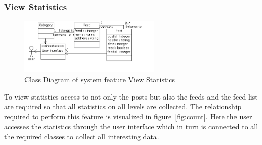 \subsubsection{View Statistics}
\begin{figure}[hbt]
\centering
\includegraphics[width=0.6\textwidth]
{./images/CountUnreadPosts.png}
\caption{Class Diagram of system feature View Statistics}
\label{fig:statistics}
\end{figure}
To view statistics access to not only the posts but also the feeds and the feed list are required so that all statistics on all levels are collected. The relationship required to perform this feature is visualized in figure~\ref{fig:count}. Here the user accesses the statistics through the user interface which in turn is connected to all the required classes to collect all interesting data. \\
